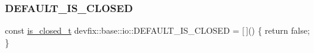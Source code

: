 \subsubsection{\texorpdfstring{D\+E\+F\+A\+U\+L\+T\+\_\+\+I\+S\+\_\+\+C\+L\+O\+S\+ED}{DEFAULT\_IS\_CLOSED}}
{\footnotesize\ttfamily const \hyperlink{namespacedevfix_1_1base_1_1io_a14f89d4437ced6ede49c044ee8e71f17}{is\+\_\+closed\+\_\+t} devfix\+::base\+::io\+::\+D\+E\+F\+A\+U\+L\+T\+\_\+\+I\+S\+\_\+\+C\+L\+O\+S\+ED = \mbox{[}$\,$\mbox{]}() \{ return false; \}}

